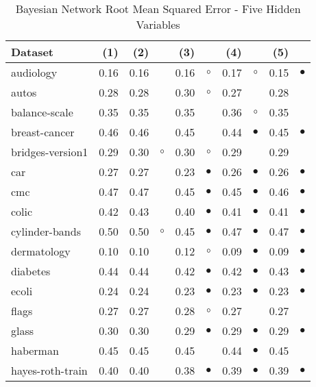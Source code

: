 \newpage
{\centering \footnotesize \begin{longtable}{lrr@{\hspace{0.1cm}}cr@{\hspace{0.1cm}}cr@{\hspace{0.1cm}}cr@{\hspace{0.1cm}}c}
\caption{\label{bnrmse5}Bayesian Network Root Mean Squared Error - Five Hidden Variables}
\\
\hline
Dataset & (1)& (2) & & (3) & & (4) & & (5) & \\
\hline
audiology & 0.16 & 0.16 &           & 0.16 &   $\circ$ & 0.17 &   $\circ$ & 0.15 & $\bullet$\\
autos & 0.28 & 0.28 &           & 0.30 &   $\circ$ & 0.27 &           & 0.28 &          \\
balance-scale & 0.35 & 0.35 &           & 0.35 &           & 0.36 &   $\circ$ & 0.35 &          \\
breast-cancer & 0.46 & 0.46 &           & 0.45 &           & 0.44 & $\bullet$ & 0.45 & $\bullet$\\
bridges-version1 & 0.29 & 0.30 &   $\circ$ & 0.30 &   $\circ$ & 0.29 &           & 0.29 &          \\
car & 0.27 & 0.27 &           & 0.23 & $\bullet$ & 0.26 & $\bullet$ & 0.26 & $\bullet$\\
cmc & 0.47 & 0.47 &           & 0.45 & $\bullet$ & 0.45 & $\bullet$ & 0.46 & $\bullet$\\
colic & 0.42 & 0.43 &           & 0.40 & $\bullet$ & 0.41 & $\bullet$ & 0.41 & $\bullet$\\
cylinder-bands & 0.50 & 0.50 &   $\circ$ & 0.45 & $\bullet$ & 0.47 & $\bullet$ & 0.47 & $\bullet$\\
dermatology & 0.10 & 0.10 &           & 0.12 &   $\circ$ & 0.09 & $\bullet$ & 0.09 & $\bullet$\\
diabetes & 0.44 & 0.44 &           & 0.42 & $\bullet$ & 0.42 & $\bullet$ & 0.43 & $\bullet$\\
ecoli & 0.24 & 0.24 &           & 0.23 & $\bullet$ & 0.23 & $\bullet$ & 0.23 & $\bullet$\\
flags & 0.27 & 0.27 &           & 0.28 &   $\circ$ & 0.27 &           & 0.27 &          \\
glass & 0.30 & 0.30 &           & 0.29 & $\bullet$ & 0.29 & $\bullet$ & 0.29 & $\bullet$\\
haberman & 0.45 & 0.45 &           & 0.45 &           & 0.44 & $\bullet$ & 0.45 &          \\
hayes-roth-train & 0.40 & 0.40 &           & 0.38 & $\bullet$ & 0.39 & $\bullet$ & 0.39 & $\bullet$\\

\end{longtable}}
